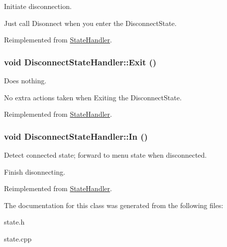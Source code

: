Initiate disconnection. 

Just call Disonnect when you enter the DisconnectState.

Reimplemented from \hyperlink{classStateHandler_c08036e743cf5172d6931cf3b6d321c6}{StateHandler}.\hypertarget{classDisconnectStateHandler_3b5e52496b753f788c886808dae652b9}{
\subsubsection[{Exit}]{\setlength{\rightskip}{0pt plus 5cm}void DisconnectStateHandler::Exit ()}}
\label{classDisconnectStateHandler_3b5e52496b753f788c886808dae652b9}


Does nothing. 

No extra actions taken when Exiting the DisconnectState.

Reimplemented from \hyperlink{classStateHandler_5ce0f2cb3d4a9f5aca137d47eac75c1e}{StateHandler}.\hypertarget{classDisconnectStateHandler_7c8ad84d526c43376d480ce6dc1e8cc3}{
\subsubsection[{In}]{\setlength{\rightskip}{0pt plus 5cm}void DisconnectStateHandler::In ()}}
\label{classDisconnectStateHandler_7c8ad84d526c43376d480ce6dc1e8cc3}


Detect connected state; forward to menu state when disconnected. 

Finish disonnecting.

Reimplemented from \hyperlink{classStateHandler_cee16f855e7354d21abafa47acd1046c}{StateHandler}.

The documentation for this class was generated from the following files:\begin{CompactItemize}
\item 
state.h\item 
state.cpp\end{CompactItemize}
